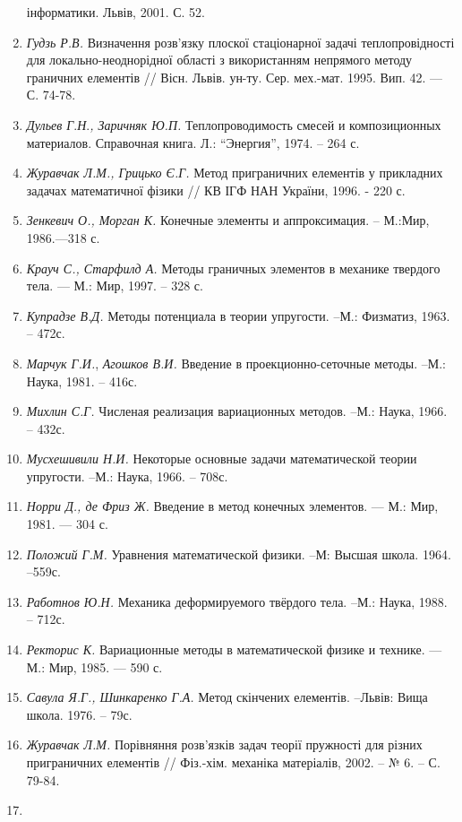 \begin{enumerate}
  інформатики. Львів, 2001. С. 52.
\item
  \emph{Гудзь Р.В.} Визначення розв'язку плоскої стаціонарної задачі
  теплопровідності для локально-неоднорідної області з використанням
  непрямого методу граничних елементів // Вісн. Львів. ун-ту. Сер.
  мех.-мат. 1995. Вип. 42. --- С. 74-78.
\item
  \emph{Дульев Г}.\emph{Н}.\emph{, Заричняк Ю.П.} Теплопроводимость
  смесей и композиционных материалов. Справочная книга. Л.: ``Энергия'',
  1974. -- 264 с.
\item
  \emph{Журавчак Л.М., Грицько Є.Г.} Метод приграничних елементів у
  прикладних задачах математичної фізики // КВ ІГФ НАН України, 1996. -
  220 с.
\item
  \emph{Зенкевич О., Морган К.} Конечные элементы и аппроксимация. --
  М.:Мир, 1986.---318 с.
\item
  \emph{Крауч С., Старфилд А.} Методы граничных элементов в механике
  твердого тела. --- М.: Мир, 1997. -- 328 с.
\item
  \emph{Купрадзе В.Д.} Методы потенциала в теории упругости. --М.:
  Физматиз, 1963. -- 472с.
\item
  \emph{Марчук Г.И.}, \emph{Агошков В.И.} Введение в
  проекционно-сеточные методы. --М.: Наука, 1981. -- 416с.
\item
  \emph{Михлин С.Г.} Численая реализация вариационных методов. --М.:
  Наука, 1966. -- 432с.
\item
  \emph{Мусхешивили Н.И.} Некоторые основные задачи математической
  теории упругости. --М.: Наука, 1966. -- 708с.
\item
  \emph{Норри Д., де Фриз Ж.} Введение в метод конечных элементов. ---
  М.: Мир, 1981. --- 304 с.
\item
  \emph{Положий Г.М.} Уравнения математической физики. --М: Высшая
  школа. 1964. --559с.
\item
  \emph{Работнов Ю.Н.} Механика деформируемого твёрдого тела. --М.:
  Наука, 1988. -- 712с.
\item
  \emph{Ректорис К.} Вариационные методы в математической физике и
  технике. --- М.: Мир, 1985. --- 590 с.
\item
  \emph{Савула Я.Г., Шинкаренко Г.А.} Метод скінчених елементів.
  --Львів: Вища школа. 1976. -- 79с.
\item
  \emph{Журавчак Л.М.} Порівняння розв'язків задач теорії пружності для
  різних пригра­ничних елемен­тів // Фіз.-хім. меха­ніка матеріалів,
  2002. -- № 6. -- С. 79-84.
\item

\end{enumerate}
